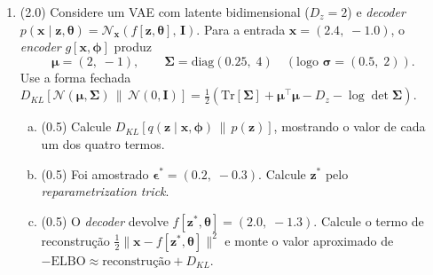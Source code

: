 \documentclass[11pt,a4paper]{article}
\newcommand{\thetav}{\boldsymbol{\theta}}
\begin{document}
\begin{enumerate}[1)]
\begin{enumerate}[a)]
    \item ( )\,V \quad ( )\,F \quad No modelo difusor, o \textit{encoder} que adiciona ruído possui parâmetros treináveis ajustados em conjunto com o \textit{decoder}, de forma análoga ao \textit{encoder} de um VAE.\\[0.2em]
    \rule{\linewidth}{0.4pt}\\[0.2em]
    \rule{\linewidth}{0.4pt}

    \item ( )\,V \quad ( )\,F \quad No trilema dos modelos geradores, os modelos difusores ocupam o canto \emph{qualidade $+$ cobertura}, pagando com amostragem lenta (tipicamente $T \approx 1000$ passos pela U-Net).\\[0.2em]
    \rule{\linewidth}{0.4pt}\\[0.2em]
    \rule{\linewidth}{0.4pt}
\end{enumerate}

\item (2.0) Considere um VAE com latente bidimensional ($D_z = 2$) e \textit{decoder} $p(\mathbf{x} \mid \mathbf{z}, \thetav) = \mathcal{N}_{\mathbf{x}}\!\left(f[\mathbf{z},\thetav],\, \mathbf{I}\right)$. Para a entrada $\mathbf{x} = (2.4,\; -1.0)$, o \textit{encoder} $g[\mathbf{x},\boldsymbol{\phi}]$ produz
\[
  \boldsymbol{\mu} = (2,\; -1), \qquad \boldsymbol{\Sigma} = \mathrm{diag}(0.25,\; 4) \quad (\text{logo } \boldsymbol{\sigma} = (0.5,\; 2)).
\]
Use a forma fechada $D_{KL}\!\left[\mathcal{N}(\boldsymbol{\mu},\boldsymbol{\Sigma})\,\|\,\mathcal{N}(0,\mathbf{I})\right] = \tfrac{1}{2}\!\left(\mathrm{Tr}[\boldsymbol{\Sigma}] + \boldsymbol{\mu}^{\top}\boldsymbol{\mu} - D_z - \log\det\boldsymbol{\Sigma}\right)$.

\begin{enumerate}[a)]
    \item (0.5) Calcule $D_{KL}\!\left[q(\mathbf{z} \mid \mathbf{x}, \boldsymbol{\phi})\,\|\,p(\mathbf{z})\right]$, mostrando o valor de cada um dos quatro termos.
    \vspace{2.5cm}

    \item (0.5) Foi amostrado $\boldsymbol{\epsilon}^{*} = (0.2,\; -0.3)$. Calcule $\mathbf{z}^{*}$ pelo \textit{reparametrization trick}.
    \vspace{2cm}

    \item (0.5) O \textit{decoder} devolve $f[\mathbf{z}^{*},\thetav] = (2.0,\; -1.3)$. Calcule o termo de reconstrução $\tfrac{1}{2}\lVert \mathbf{x} - f[\mathbf{z}^{*},\thetav]\rVert^{2}$ e monte o valor aproximado de $-\mathrm{ELBO} \approx \text{reconstrução} + D_{KL}$.
    \vspace{2.5cm}


\end{enumerate}
\end{enumerate}
\end{document}
